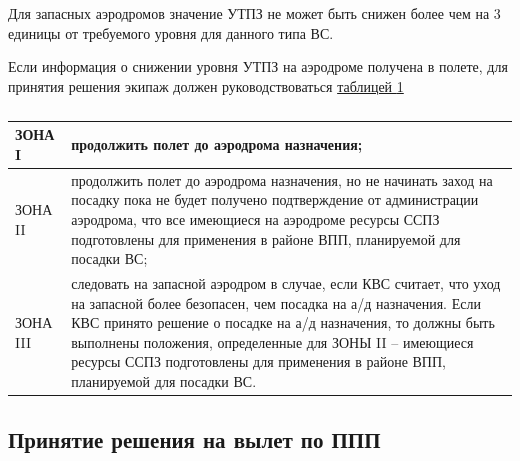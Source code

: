 	
Для запасных аэродромов значение УТПЗ не может быть снижен более чем на 3 единицы от требуемого уровня для данного типа ВС. 

Если информация о снижении уровня УТПЗ на аэродроме получена в полете, для принятия решения экипаж должен руководствоваться \hyperref[tbl:04T6]{таблицей \ref*{tbl:04T6}} 

 
\begin{table}[H]
    \begin{center}
    \caption{} \label{tbl:04T6}
    \small
    \begin{tabular}{|p{}|p{}|}
    \hline
    ЗОНА I  &продолжить полет до аэродрома назначения;\\\hline
    ЗОНА II &продолжить полет до аэродрома назначения, но не начинать заход на посадку пока не будет получено подтверждение от администрации аэродрома, что все имеющиеся на аэродроме ресурсы ССПЗ подготовлены для применения в районе ВПП, планируемой для посадки ВС;\\\hline
    ЗОНА III&следовать на запасной аэродром в случае, если КВС считает, что уход на запасной более безопасен, чем посадка на а/д назначения. Если КВС принято решение о посадке на а/д назначения, то должны быть выполнены положения, определенные для ЗОНЫ II – имеющиеся ресурсы ССПЗ подготовлены для применения в районе ВПП, планируемой для посадки ВС.\\
    \hline\hline
    \end{tabular}
    \end{center}
\end{table}

	

\subsection{Принятие решения на вылет по ППП}

